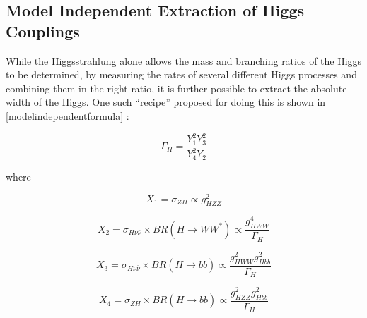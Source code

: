  
\subsection{Model Independent Extraction of Higgs Couplings}


While the Higgsstrahlung alone allows the mass and branching ratios of the Higgs to be determined, by measuring the rates of several different Higgs processes and combining them in the right ratio, it is further possible to extract the absolute width of the Higgs. One such ``recipe'' proposed for doing this is shown in \ref{modelindependentformula} \cite{Durig:2014lfa}:

\begin{equation}
  \label{modelindependentformula}
  \Gamma_H = \frac{Y_1^2Y_3^2}{Y_4^2Y_2}
\end{equation}

where

\begin{equation}
X_1=\sigma_{ZH} \propto g_{HZZ}^2
\end{equation}

\begin{equation}
  \label{X2}
  X_2=\sigma_{H\nu\bar{\nu}} \times BR(H\rightarrow WW^*) \propto \frac{g_{HWW}^4}{\Gamma_H}
\end{equation}

\begin{equation}
X_3=\sigma_{H\nu\bar{\nu}} \times BR(H\rightarrow b\bar{b}) \propto \frac{g_{HWW}^{2}g_{Hbb}^2}{\Gamma_H}
\end{equation}

\begin{equation}
X_4=\sigma_{ZH} \times BR(H\rightarrow b\bar{b}) \propto \frac{g_{HZZ}^{2}g_{Hbb}^2}{\Gamma_H}
\end{equation}


